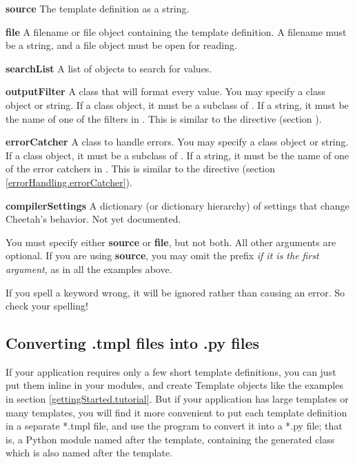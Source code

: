 \begin{description}
\item{{\bf source}}
     The template definition as a string.  
\item{{\bf file}}
     A filename or file object containing the template definition.
     A filename must be a string, and a file object must be open for reading.
\item{{\bf searchList}}
     A list of objects to search for  values.
\item{{\bf outputFilter}}
     A class that will format every  value.  You may
     specify a class object or string.  If a class object,
     it must be a subclass of .  If a string, it
     must be the name of one of the filters in .
     This is similar to the  directive (section
     \label{output.filter}).
\item{{\bf errorCatcher}}
     A class to handle  errors.  You may
     specify a class object or string.  If a class object,
     it must be a subclass of .  
     If a string, it must be the name of one of the error catchers in
     .  This is similar to the 
      directive 
     (section \ref{errorHandling.errorCatcher}).
\item{{\bf compilerSettings}}
     A dictionary (or dictionary hierarchy) of settings that change Cheetah's
     behavior.  Not yet documented.
\end{description}

You must specify either {\bf source} or {\bf file}, but not both.  All other
arguments are optional.  If you are using {\bf source}, you may omit the
 prefix {\em if it is the first argument}, as in all the examples
above.

If you spell a keyword wrong, it will be ignored rather than causing an error.
So check your spelling!


\subsection{Converting .tmpl files into .py files}
\label{howWorks.tmpl2py}
\label{howWorks.cheetah-compile}

If your application requires only a few short template definitions, you can
just put them inline in your modules, and create Template objects like the
examples in section \ref{gettingStarted.tutorial}.  But if your application
has large templates or many templates, you will find it more convenient to
put each template definition in a separate *.tmpl file, and use the
 program to convert it into a *.py file; that is, a
Python module named after the template, containing the generated class
which is also named after the template.  

